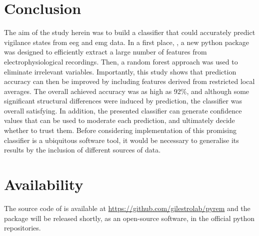 \section*{Conclusion}

The aim of the study herein was to build a classifier that could accurately predict vigilance states from \gls{eeg} and \gls{emg} data.
In a first place, \pr{}, a new python package was designed to efficiently extract a large number of features from electrophysiological recordings.
Then, a random forest approach was used to eliminate irrelevant variables.
Importantly, this study shows that prediction accuracy can then be improved by including features derived from restricted local averages.
The overall achieved accuracy was as high as 92\%, and although some significant structural differences were induced by prediction,
the classifier was overall satisfying.
In addition, the presented classifier can generate confidence values that can be used to moderate each prediction, and ultimately decide whether to trust them.
Before considering implementation of this promising classifier is a ubiquitous software tool,
it would be necessary to generalise its results by the inclusion of different sources of data.

\section*{Availability}
The source code of \pr{} is available at \href{https://github.com/gilestrolab/pyrem}{https://github.com/gilestrolab/pyrem}
and the package will be released shortly, as an open-source software, in the official python repositories.


